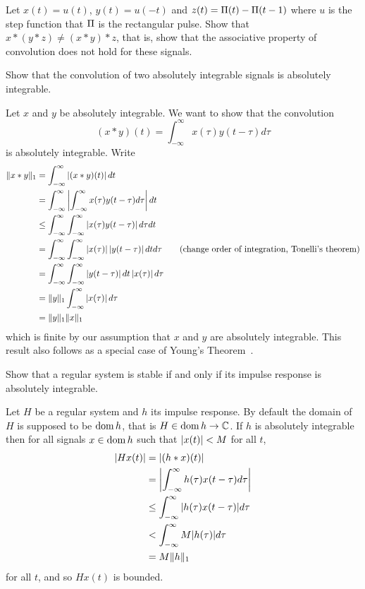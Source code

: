 \begin{excersizelist}
\item Let $x(t) = u(t)$, $y(t) = u(-t)$ and $z(t) = \Pi(t) - \Pi(t - 1)$ where $u$ is the step function that $\Pi$ is the rectangular pulse.  Show that $x * (y * z) \neq (x * y) * z$, that is, show that the associative property of convolution does not hold for these signals.

\item \label{excer:convabsisabs} Show that the convolution of two absolutely integrable signals is absolutely integrable.
\begin{solution}
Let $x$ and $y$ be absolutely integrable.  We want to show that the convolution
\[
(x * y)(t) = \int_{-\infty}^\infty x(\tau) y(t - \tau) d\tau
\]
is absolutely integrable.  Write
\begin{align*}
\|x * y\|_1 &= \int_{-\infty}^\infty \left\vert (x * y)(t) \right\vert dt \\
&= \int_{-\infty}^\infty \left\vert \int_{-\infty}^\infty x(\tau) y(t - \tau) d\tau  \right\vert dt \\
 &\leq \int_{-\infty}^\infty \int_{-\infty}^\infty \left\vert  x(\tau) y(t - \tau)  \right\vert d\tau dt \\
 &= \int_{-\infty}^\infty \int_{-\infty}^\infty \left\vert  x(\tau)   \right\vert\left\vert  y(t - \tau)  \right\vert dt d\tau \qquad \text{(change order of integration, Tonelli's theorem)} \\
 &= \int_{-\infty}^\infty \int_{-\infty}^\infty \left\vert  y(t - \tau)  \right\vert dt \left\vert  x(\tau)  \right\vert d\tau \\
  &= \|y\|_1 \int_{-\infty}^\infty \left\vert  x(\tau)  \right\vert d\tau \\
  &= \|y\|_1 \|x\|_1
\end{align*}
which is finite by our assumption that $x$ and $y$ are absolutely integrable.  This result also follows as a special case of Young's Theorem~\citep{Rudin_real_and_complex_analysis}.
\end{solution}


\item \label{excer:bibostableimpulseresp} Show that a regular system is stable if and only if its impulse response is absolutely integrable.
\begin{solution}
Let $H$ be a regular system and $h$ its impulse response.  By default the domain of $H$ is supposed to be $\operatorname{dom} h$, that is $H \in \operatorname{dom} h \to {\mathbb C}$.  If $h$ is absolutely integrable then for all signals $x \in \operatorname{dom} h$ such that $\vert x(t) \vert < M$ for all $t$,
\begin{align*}
\left\vert H x(t) \right\vert &= \left\vert (h * x)(t) \right\vert \\
&= \left\vert \int_{-\infty}^\infty h(\tau)  x(t - \tau) d\tau \right\vert \\
&\leq \int_{-\infty}^\infty \vert h(\tau) x(t - \tau) \vert d\tau \\
&< \int_{-\infty}^\infty M \vert h(\tau) \vert d\tau \\
&= M \|h\|_1
\end{align*}
for all $t$, and so $H x(t)$ is bounded.  


\end{solution}
\end{excersizelist}
